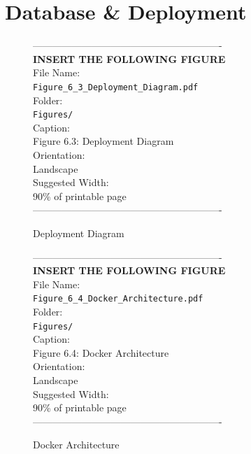 \documentclass[12pt, a4paper]{report}
\begin{document}
\section{Database \& Deployment}
\vspace{1em}
\begin{figure}[htbp]
\begin{center}
----------------------------------------------------------\\
\vspace{0.5em}
\textbf{INSERT THE FOLLOWING FIGURE}\\
\vspace{1em}
File Name:\\
\texttt{Figure\_6\_3\_Deployment\_Diagram.pdf}\\
\vspace{1em}
Folder:\\
\texttt{Figures/}\\
\vspace{1em}
Caption:\\
Figure 6.3: Deployment Diagram\\
\vspace{1em}
Orientation:\\
Landscape\\
\vspace{1em}
Suggested Width:\\
90\% of printable page\\
\vspace{3cm}
----------------------------------------------------------
\end{center}
\caption{Deployment Diagram}
\label{fig:diag_11}
\end{figure}
\vspace{1em}
\begin{figure}[htbp]
\begin{center}
----------------------------------------------------------\\
\vspace{0.5em}
\textbf{INSERT THE FOLLOWING FIGURE}\\
\vspace{1em}
File Name:\\
\texttt{Figure\_6\_4\_Docker\_Architecture.pdf}\\
\vspace{1em}
Folder:\\
\texttt{Figures/}\\
\vspace{1em}
Caption:\\
Figure 6.4: Docker Architecture\\
\vspace{1em}
Orientation:\\
Landscape\\
\vspace{1em}
Suggested Width:\\
90\% of printable page\\
\vspace{3cm}
----------------------------------------------------------
\end{center}
\caption{Docker Architecture}
\label{fig:diag_12}
\end{figure}
\end{document}
